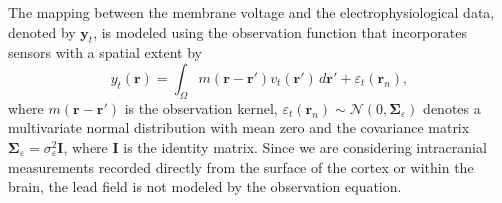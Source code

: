 \documentclass[conference]{IEEEtran}
\begin{document}
The mapping between the membrane voltage and the electrophysiological data, denoted by $\mathbf{y}_t$, is modeled using the observation function that incorporates sensors with a spatial extent by
\begin{equation}\label{eq:ObservationEquation}
	y_t(\mathbf{r}) = \int_{\Omega} { m\left(\mathbf{r}-\mathbf{r}'\right) v_t\left(\mathbf{r}'\right) \, d\mathbf{r}'} + \varepsilon_t(\mathbf{r}_n), 
\end{equation}
where $m\left(\mathbf{r}-\mathbf{r}'\right)$ is the observation kernel, $\varepsilon_t(\mathbf{r}_n) \sim \mathcal{N}\left(0,\boldsymbol{\Sigma}_{\varepsilon}\right)$ denotes a multivariate normal distribution with mean zero and the covariance matrix $\boldsymbol{\Sigma}_{\varepsilon} = \sigma_{\varepsilon}^2\mathbf{I}$, where $\mathbf{I}$ is the identity matrix. Since we are considering intracranial measurements recorded directly from the surface of the cortex or within the brain, the lead field is not modeled by the observation equation.
\end{document}
